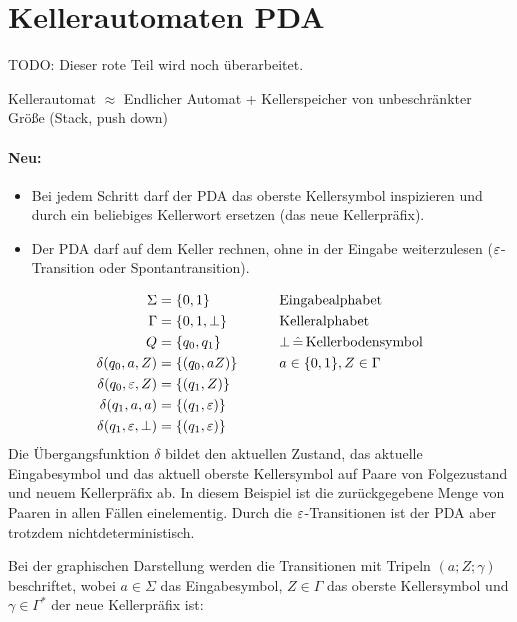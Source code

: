 \section[Kellerautomaten (\acs*{PDA})]{Kellerautomaten \quad\normalfont\normalsize \acf{PDA}}
\newcommand{\ConfRel}{\rhd}
\newcommand{\Zinit}{Z^\mathsf{init}}
\newcommand{\K}{\mathcal{K}}

{\color{red} TODO: Dieser rote Teil wird noch überarbeitet.

Kellerautomat $\approx$ Endlicher Automat + Kellerspeicher von unbeschränkter Größe (Stack, push down)
\paragraph*{Neu:}
\begin{itemize}
        \item Bei jedem Schritt darf der \ac{PDA} das oberste Kellersymbol inspizieren und durch ein beliebiges Kellerwort ersetzen (das neue Kellerpräfix).
        \item Der \ac{PDA} darf auf dem Keller rechnen, ohne in der Eingabe weiterzulesen ($\varepsilon$-Transition oder Spontantransition).
\end{itemize}
\begin{Bsp}
\label{bsp:pda-wwr}
        \begin{align}
                \Sigma &= \{0,1\} &\qquad&\text{Eingabealphabet} \notag\\
                \Gamma &= \{0,1,\bot\} &&\text{Kelleralphabet} \notag\\
                Q &= \{q_0,q_1\} &&\bot\,\hat=\,\text{Kellerbodensymbol} \notag\\
                \delta(q_0,a,Z) &= \{(q_0,aZ) \}&& a\in\{0,1\},Z\in\Gamma\\
                \delta(q_0,\varepsilon,Z) &= \{(q_1,Z)\} \label{eq:5.2}\\
                \delta(q_1,a,a) &= \{(q_1,\varepsilon)\}\\
                \delta(q_1,\varepsilon,\bot) &= \{(q_1,\varepsilon)\}
        \end{align}
  Die Übergangsfunktion $\delta$ bildet den aktuellen Zustand, das aktuelle Eingabesymbol und das aktuell oberste Kellersymbol auf Paare von Folgezustand und neuem Kellerpräfix ab.
  In diesem Beispiel ist die zurückgegebene Menge von Paaren in allen Fällen einelementig.
  Durch die $\varepsilon$-Transitionen ist der PDA aber trotzdem nichtdeterministisch.

  Bei der graphischen Darstellung werden die Transitionen mit Tripeln $(a;Z;\gamma)$ beschriftet, wobei $a \in \Sigma$ das Eingabesymbol, $Z \in \Gamma$ das oberste Kellersymbol und $\gamma \in \Gamma^*$ der neue Kellerpräfix ist:
  \begin{center}
\end{center}
\end{Bsp}}
